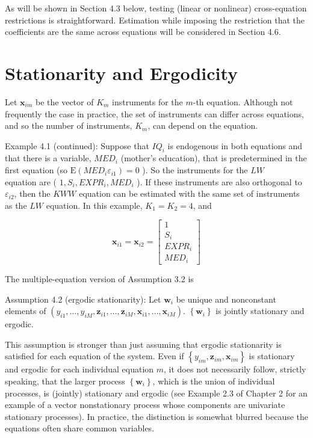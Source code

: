 \documentclass[10pt]{article}
\begin{document}
As will be shown in Section 4.3 below, testing (linear or nonlinear) cross-equation restrictions is straightforward. Estimation while imposing the restriction that the coefficients are the same across equations will be considered in Section 4.6.

\section*{Stationarity and Ergodicity}
Let $\mathbf{x}_{i m}$ be the vector of $K_{m}$ instruments for the $m$-th equation. Although not frequently the case in practice, the set of instruments can differ across equations, and so the number of instruments, $K_{m}$, can depend on the equation.

Example 4.1 (continued): Suppose that $I Q_{i}$ is endogenous in both equations and that there is a variable, $M E D_{i}$ (mother's education), that is predetermined in the first equation (so $\mathrm{E}\left(M E D_{i} \varepsilon_{i 1}\right)=0$ ). So the instruments for the $L W$\\
equation are ( $1, S_{i}, E X P R_{i}, M E D_{i}$ ). If these instruments are also orthogonal to $\varepsilon_{i 2}$, then the $K W W$ equation can be estimated with the same set of instruments as the $L W$ equation. In this example, $K_{1}=K_{2}=4$, and

\[
\mathbf{x}_{i 1}=\mathbf{x}_{i 2}=\left[\begin{array}{c}
1  \tag{4.1.3}\\
S_{i} \\
E X P R_{i} \\
M E D_{i}
\end{array}\right]
\]

The multiple-equation version of Assumption 3.2 is

Assumption 4.2 (ergodic stationarity): Let $\mathbf{w}_{i}$ be unique and nonconstant elements of $\left(y_{i 1}, \ldots, y_{i M}, \mathbf{z}_{i 1}, \ldots, \mathbf{z}_{i M}, \mathbf{x}_{i 1}, \ldots, \mathbf{x}_{i M}\right)$. $\left\{\mathbf{w}_{i}\right\}$ is jointly stationary and ergodic.

This assumption is stronger than just assuming that ergodic stationarity is satisfied for each equation of the system. Even if $\left\{y_{i m}, \mathbf{z}_{i m}, \mathbf{x}_{i m}\right\}$ is stationary and ergodic for each individual equation $m$, it does not necessarily follow, strictly speaking, that the larger process $\left\{\mathbf{w}_{i}\right\}$, which is the union of individual processes, is (jointly) stationary and ergodic (see Example 2.3 of Chapter 2 for an example of a vector nonstationary process whose components are univariate stationary processes). In practice, the distinction is somewhat blurred because the equations often share common variables.
\end{document}
